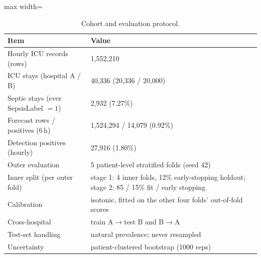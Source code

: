 \begin{table}[!t]
\centering\footnotesize
\caption{Cohort and evaluation protocol.}
\label{tab:protocol}
\begin{adjustbox}{max width=\linewidth}
\begin{tabular}{ll}
\toprule
Item & Value \\
\midrule
Hourly ICU records (rows) & 1{,}552{,}210 \\
ICU stays (hospital A / B) & 40{,}336 (20{,}336 / 20{,}000) \\
Septic stays (ever SepsisLabel $=1$) & 2{,}932 (7.27\%) \\
Forecast rows / positives (6\,h) & 1{,}524{,}294 / 14{,}079 (0.92\%) \\
Detection positives (hourly) & 27{,}916 (1.80\%) \\
Outer evaluation & 5 patient-level stratified folds (seed 42) \\
Inner split (per outer fold) & stage 1: 4 inner folds, 12\% early-stopping holdout; stage 2: 85 / 15\% fit / early stopping \\
Calibration & isotonic, fitted on the other four folds' out-of-fold scores \\
Cross-hospital & train A$\to$test B and B$\to$A \\
Test-set handling & natural prevalence; never resampled \\
Uncertainty & patient-clustered bootstrap (1000 reps) \\
\bottomrule
\end{tabular}
\end{adjustbox}
\end{table}

